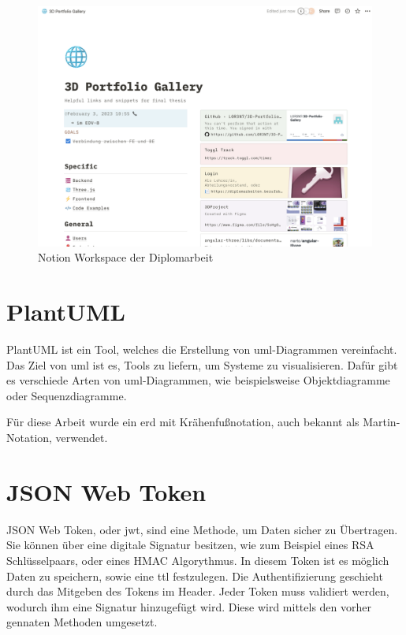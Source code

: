 \begin{figure} [h t]
  \centering
  \includegraphics[scale=0.3]{pics/NotionPage.png}
  \caption{Notion Workspace der Diplomarbeit}
  \label{fig:tech:notion-page}
\end{figure}

\section{PlantUML}
PlantUML ist ein Tool, welches die Erstellung von \gls{uml}-Diagrammen vereinfacht. 
Das Ziel von \gls{uml} ist es, Tools zu liefern, um Systeme zu visualisieren.
\cite{UMLPaper}
Dafür gibt es verschiede Arten von \gls{uml}-Diagrammen, wie beispielsweise Objektdiagramme oder Sequenzdiagramme.
\cite{PlantUML}

Für diese Arbeit wurde ein \gls{erd} mit Krähenfußnotation, auch bekannt als Martin-Notation, verwendet.

\section{JSON Web Token}
JSON Web Token, oder \gls{jwt}, sind eine Methode, um Daten sicher zu Übertragen. 
Sie können über eine digitale Signatur besitzen, wie zum Beispiel eines RSA Schlüsselpaars, oder eines HMAC Algorythmus. 
In diesem Token ist es möglich Daten zu speichern, sowie eine \gls{ttl} festzulegen. 
Die Authentifizierung geschieht durch das Mitgeben des Tokens im Header. 
Jeder Token muss validiert werden, wodurch ihm eine Signatur hinzugefügt wird. 
Diese wird mittels den vorher gennaten Methoden umgesetzt. 
\cite{JWTAbout}


